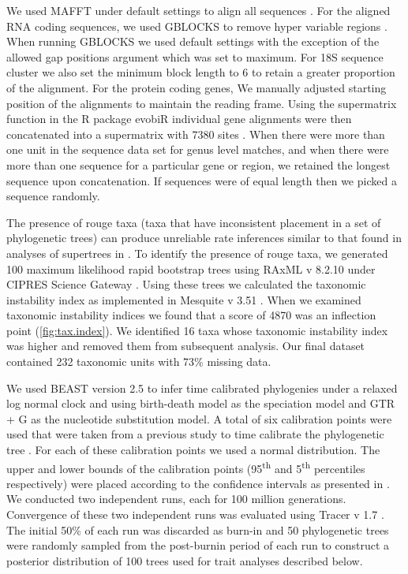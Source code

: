We used MAFFT under default settings to align all sequences \citep{katoh2013mafft}.
For the aligned RNA coding sequences, we used GBLOCKS to remove hyper variable regions \citep{castresana2000gblocks}. 
When running GBLOCKS we used default settings with the exception of the allowed gap positions argument which was set to maximum. 
For 18S sequence cluster we also set the minimum block length to 6 to retain a greater proportion of the alignment. 
For the protein coding genes, We manually adjusted starting position of the alignments to maintain the reading frame. 
Using the supermatrix function in the R package evobiR individual gene alignments were then concatenated into a supermatrix with 7380 sites \citep{blackmon2015evobir}.
When there were more than one unit in the sequence data set for genus level matches, and when there were more than one sequence for a particular gene or region, we retained the longest sequence upon concatenation. If sequences were of equal length then we picked a sequence randomly.

The presence of rouge taxa (taxa that have inconsistent placement in a set of phylogenetic trees) can produce unreliable rate inferences similar to that found in analyses of supertrees in \cite{aberer2012roguetaxa, rabosky2015b}.
To identify the presence of rouge taxa, we generated 100 maximum likelihood rapid bootstrap trees using RAxML v 8.2.10 under CIPRES Science Gateway \citep{stamatakis2014raxml,miller2010cipres}.
Using these trees we calculated the taxonomic instability index as implemented in Mesquite v 3.51 \citep{maddison2018mesquite}.
When we examined taxonomic instability indices we found that a score of 4870 was an inflection point (\cref{fig:tax.index}).
We identified 16 taxa whose taxonomic instability index was higher and removed them from subsequent analysis.
Our final dataset contained 232 taxonomic units with 73\% missing data.

We used BEAST version 2.5 \citep{bouckaert2014beast} to infer time calibrated phylogenies under a relaxed log normal clock and using birth-death model as the speciation model and GTR + G as the nucleotide substitution model.
A total of six calibration points were used that were taken from a previous study to time calibrate the phylogenetic tree \citep{misof2014phylogenomics}.
For each of these calibration points we used a normal distribution.
The upper and lower bounds of the calibration points (95\textsuperscript{th} and 5\textsuperscript{th} percentiles respectively) were placed according to the confidence intervals as presented in \citet{misof2014phylogenomics}. 
We conducted two independent runs, each for 100 million generations.
Convergence of these two independent runs was evaluated using Tracer v 1.7 \citep{rambaut2018tracer}.
The initial 50\% of each run was discarded as burn-in and 50 phylogenetic trees were randomly sampled from the post-burnin period of each run to construct a posterior distribution of 100 trees used for trait analyses described below.


